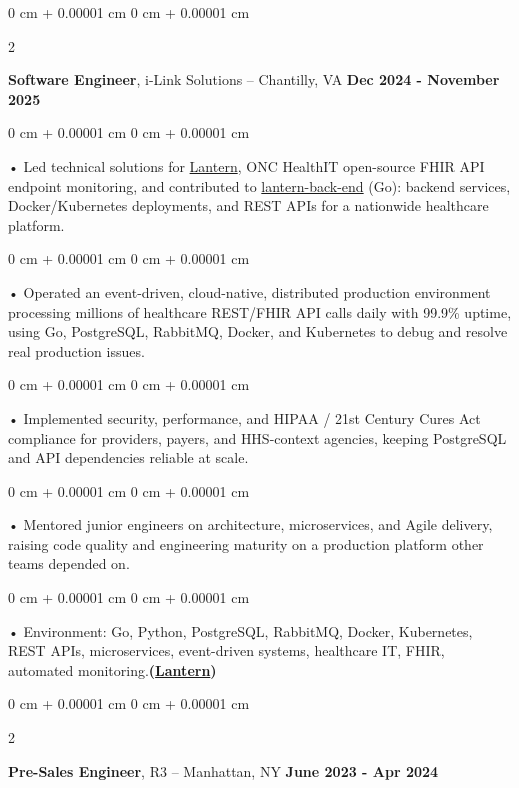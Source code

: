 \documentclass[10pt, letterpaper]{article}
\newenvironment{onecolentry}{
    \begin{adjustwidth}{
        0 cm + 0.00001 cm
    }{
        0 cm + 0.00001 cm
    }
}{
    \end{adjustwidth}
} %
\newenvironment{twocolentry}[2][]{
    \onecolentry
    \def\secondColumn{#2}
    \setcolumnwidth{\fill, 4.5 cm}
    \begin{paracol}{2}
}{
    \switchcolumn \raggedleft \secondColumn
    \end{paracol}
    \endonecolentry
} %
\begin{document}
        \vspace{0.1cm}

        \begin{twocolentry}{
            \textbf{Dec 2024 - November 2025}
        }
            \textbf{Software Engineer}, i-Link Solutions -- Chantilly, VA\end{twocolentry}


        \begin{onecolentry}
             • Led technical solutions for \href{https://lantern.healthit.gov/?tab=dashboard_tab}{Lantern}, ONC HealthIT open-source FHIR API endpoint monitoring, and contributed to \href{https://github.com/onc-healthit/lantern-back-end}{lantern-back-end} (Go): backend services, Docker/Kubernetes deployments, and REST APIs for a nationwide healthcare platform.
        \end{onecolentry}
        \begin{onecolentry}
             • Operated an event-driven, cloud-native, distributed production environment processing millions of healthcare REST/FHIR API calls daily with 99.9\% uptime, using Go, PostgreSQL, RabbitMQ, Docker, and Kubernetes to debug and resolve real production issues.
        \end{onecolentry}
        \begin{onecolentry}
             • Implemented security, performance, and HIPAA / 21st Century Cures Act compliance for providers, payers, and HHS-context agencies, keeping PostgreSQL and API dependencies reliable at scale.
        \end{onecolentry}
        \begin{onecolentry}
             • Mentored junior engineers on architecture, microservices, and Agile delivery, raising code quality and engineering maturity on a production platform other teams depended on.
        \end{onecolentry}
        \begin{onecolentry}
             • Environment: Go, Python, PostgreSQL, RabbitMQ, Docker, Kubernetes, REST APIs, microservices, event-driven systems, healthcare IT, FHIR, automated monitoring.\textbf{(\href{https://lantern.healthit.gov/?tab=dashboard_tab}{Lantern})}
        \end{onecolentry}
        \vspace{0.1cm}

        \begin{twocolentry}{
            \textbf{June 2023 - Apr 2024}
        }
            \textbf{Pre-Sales Engineer}, R3 -- Manhattan, NY\end{twocolentry}
\end{document}

